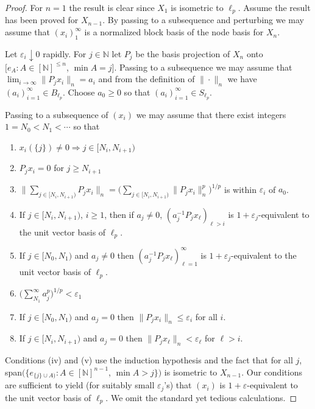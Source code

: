\documentclass[11pt,leqno]{amsart}
\theoremstyle{definition}
\newcommand{\ds}{\displaystyle}
\newcommand{\vp}{\varepsilon}
\newcommand{\N}{\mathbb{N}}
\begin{document}
\begin{proof}
For $n=1$ the result is clear since $X_1$ is isometric to $\ell_p$. 
Assume the result has been proved for $X_{n-1}$.
By passing to a subsequence and perturbing we may assume that 
$(x_i)_1^\infty$ 
is a normalized block basis of the node basis for $X_n$. 

Let $\vp_i\downarrow 0$ rapidly. 
For $j\in\N$ let $P_j$ be the basis projection of $X_n$ onto 
$[e_A :A\in [\N]^{\le n}$, $\min A=j]$. 
Passing to a subsequence we may assume that $\lim_{i\to\infty} \|P_jx_i\|_n 
= a_i$  and from the definition of $\|\cdot\|_n$ we have $(a_i)_{i=1}^\infty 
\in B_{\ell_p}$. 
Choose $a_0\ge 0$ so that $(a_i)_{i=1}^\infty \in S_{\ell_p}$. 

Passing to a subsequence of $(x_i)$ we may assume that there exist integers 
$1=N_0<N_1<\cdots$ so that 
\begin{enumerate}
\item[(i)] $x_i (\{j\})\ne0 \Rightarrow j\in [N_i,N_{i+1})$ 
\item[(ii)] $P_jx_i=0$ for $j\ge N_{i+1}$ 
\smallskip
\item[(iii)] $\ds  \Big\|\sum_{j\in [N_i,N_{i+1})} P_jx_i\Big\|_n 
= \biggl( \sum_{j\in [N_i,N_{i+1})} \|P_j x_i \|_n^p\biggr)^{1/p}$ 
is within $\vp_i$ of $a_0$. 
\smallskip
\item[(iv)] If $j\in [N_i,N_{i+1})$, $i\ge 1$, then if $a_j\ne 0$,  
$(a_j^{-1}P_jx_\ell)_{\ell>i}$ is $1+\vp_j$-equivalent to the unit 
vector basis of $\ell_p$. 
\item[(v)] If $j\in [N_0,N_1)$ and $a_j\ne0$ then $(a_j^{-1} 
P_jx_\ell)_{\ell=1}^\infty$ is $1+\vp_j$-equivalent to the unit vector 
basis of $\ell_p$.
\smallskip
\item[(vi)] $\ds \biggl(\sum_{N_1}^\infty a_j^p\biggr)^{1/p} <\vp_1$ 
\smallskip
\item[(vii)] If $j\in [N_0,N_1)$ and $a_j =0$ then $\|P_j x_i\|_n\le\vp_i$ 
for all $i$. 
\item[(viii)] If $j\in [N_i,N_{i+1})$ and $a_j =0$ then $\|P_jx_\ell\|_n 
< \vp_\ell$ for $\ell>i$.
\end{enumerate}

Conditions (iv) and (v) use the induction hypothesis and the fact that for 
all $j$,\break
span$(\{e_{\{j\}\cup A)} :A\in [\N]^{n-1}$, $\min A>j\})$ 
is isometric to $X_{n-1}$.  
Our conditions are sufficient to yield (for suitably small $\vp_j$'s) that 
$(x_i)$ is $1+\vp$-equivalent to the unit vector basis of $\ell_p$. 
We omit the standard yet tedious calculations.
\end{proof}
\end{document}
